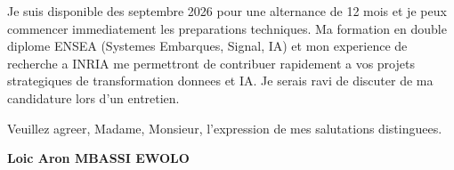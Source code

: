\documentclass[a4paper,11pt]{article}
\begin{document}
Je suis disponible des septembre 2026 pour une alternance de 12 mois et je peux commencer immediatement les preparations techniques. Ma formation en double diplome ENSEA (Systemes Embarques, Signal, IA) et mon experience de recherche a INRIA me permettront de contribuer rapidement a vos projets strategiques de transformation donnees et IA. Je serais ravi de discuter de ma candidature lors d'un entretien.

\vspace{1.5em}
\noindent Veuillez agreer, Madame, Monsieur, l'expression de mes salutations distinguees.

\vspace{2em}
\noindent \textbf{Loic Aron MBASSI EWOLO}
\end{document}
